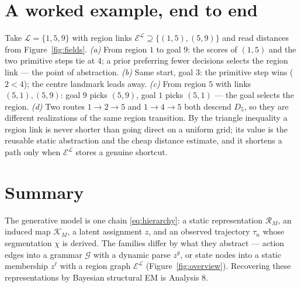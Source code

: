 \documentclass[11pt]{article}
\begin{document}
\section{A worked example, end to end}

Take $\mathcal L=\{1,5,9\}$ with region links
$\mathcal E^{\mathcal L}\supseteq\{(1,5),(5,9)\}$ and read distances from
Figure~\ref{fig:fields}. \emph{(a)} From region $1$ to goal $9$: the scores of
$(1,5)$ and the two primitive steps tie at $4$; a prior preferring fewer decisions selects
the region link --- the point of abstraction. \emph{(b)} Same start, goal $3$: the primitive
step wins ($2<4$); the centre landmark leads away. \emph{(c)} From region $5$ with links
$(5,1),(5,9)$: goal $9$ picks $(5,9)$, goal $1$ picks $(5,1)$ --- the goal selects the
region. \emph{(d)} Two routes $1\!\to\!2\!\to\!5$ and $1\!\to\!4\!\to\!5$ both descend
$D_5$, so they are different realizations of the same region transition. By the triangle
inequality a region link is never shorter than going direct on a uniform grid; its value is
the reusable static abstraction and the cheap distance estimate, and it shortens a path only
when $\mathcal E^{\mathcal L}$ stores a genuine shortcut.

\section{Summary}

The generative model is one chain \eqref{eq:hierarchy}: a static representation
$\mathcal R_M$, an induced map $\mathcal K_M$, a latent assignment $z$, and an observed
trajectory $\tau_n$ whose segmentation $\chi$ is derived. The families differ by what they
abstract --- action edges into a grammar $\mathcal G$ with a dynamic parse $z^{g}$, or state
nodes into a static membership $z^{\ell}$ with a region graph $\mathcal E^{\mathcal L}$
(Figure~\ref{fig:overview}). Recovering these representations by Bayesian structural EM is
Analysis 8.
\end{document}

